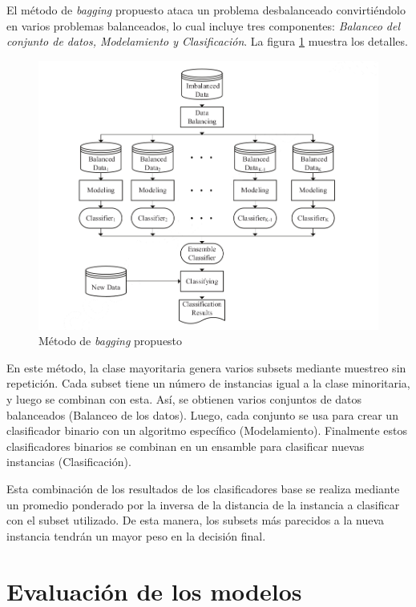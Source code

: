 El método de \textit{bagging} propuesto \citep{sun2015novel} ataca un problema desbalanceado convirtiéndolo en varios problemas balanceados, lo cual incluye tres componentes: \textit{Balanceo del conjunto de datos, Modelamiento y Clasificación}. La figura \ref{fig:bagging-imbalanced} muestra los detalles.

\begin{figure}[htbp]
	\centering
	\includegraphics[width=\linewidth]{graficos/bagging_imbalanced.png}
	\caption{Método de \textit{bagging} propuesto \citep{sun2015novel}}
	\label{fig:bagging-imbalanced}
\end{figure}

En este método, la clase mayoritaria genera varios subsets mediante muestreo sin repetición. Cada subset tiene un número de instancias igual a la clase minoritaria, y luego se combinan con esta. Así, se obtienen varios conjuntos de datos balanceados (Balanceo de los datos). Luego, cada conjunto se usa para crear un clasificador binario con un algoritmo específico (Modelamiento). Finalmente estos clasificadores binarios se combinan en un ensamble para clasificar nuevas instancias (Clasificación).

Esta combinación de los resultados de los clasificadores base se realiza mediante un promedio ponderado por la inversa de la distancia de la instancia a clasificar con el subset utilizado. De esta manera, los subsets más parecidos a la nueva instancia tendrán un mayor peso en la decisión final.


\section{Evaluación de los modelos}

